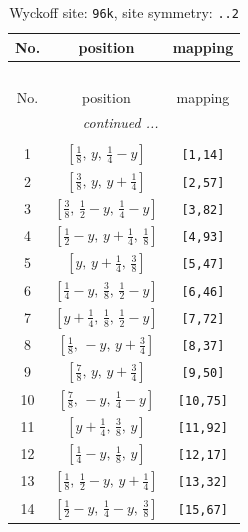 \documentclass[fleqn,8pt]{jsarticle}
\begin{document}
\begin{longtable}{ccc}
\caption{Wyckoff site: {\tt 96k}, site symmetry: {\tt ..2}}
 \\
 \hline \hline
No. & position & mapping \\ \hline \endfirsthead

\multicolumn{2}{l}{\tablename\ \thetable{}} \\
 \hline \hline
No. & position & mapping \\ \hline \endhead

 \hline \hline
\multicolumn{2}{r}{\footnotesize\it continued ...} \\ \endfoot

 \hline \hline
\multicolumn{2}{r}{} \\ \endlastfoot

1 & $\left[ \frac{1}{8},\, y,\, \frac{1}{4} - y \right]$ & {\tt [1,14]} \\ \hline
2 & $\left[ \frac{3}{8},\, y,\, y + \frac{1}{4} \right]$ & {\tt [2,57]} \\ \hline
3 & $\left[ \frac{3}{8},\, \frac{1}{2} - y,\, \frac{1}{4} - y \right]$ & {\tt [3,82]} \\ \hline
4 & $\left[ \frac{1}{2} - y,\, y + \frac{1}{4},\, \frac{1}{8} \right]$ & {\tt [4,93]} \\ \hline
5 & $\left[ y,\, y + \frac{1}{4},\, \frac{3}{8} \right]$ & {\tt [5,47]} \\ \hline
6 & $\left[ \frac{1}{4} - y,\, \frac{3}{8},\, \frac{1}{2} - y \right]$ & {\tt [6,46]} \\ \hline
7 & $\left[ y + \frac{1}{4},\, \frac{1}{8},\, \frac{1}{2} - y \right]$ & {\tt [7,72]} \\ \hline
8 & $\left[ \frac{1}{8},\, - y,\, y + \frac{3}{4} \right]$ & {\tt [8,37]} \\ \hline
9 & $\left[ \frac{7}{8},\, y,\, y + \frac{3}{4} \right]$ & {\tt [9,50]} \\ \hline
10 & $\left[ \frac{7}{8},\, - y,\, \frac{1}{4} - y \right]$ & {\tt [10,75]} \\ \hline
11 & $\left[ y + \frac{1}{4},\, \frac{3}{8},\, y \right]$ & {\tt [11,92]} \\ \hline
12 & $\left[ \frac{1}{4} - y,\, \frac{1}{8},\, y \right]$ & {\tt [12,17]} \\ \hline
13 & $\left[ \frac{1}{8},\, \frac{1}{2} - y,\, y + \frac{1}{4} \right]$ & {\tt [13,32]} \\ \hline
14 & $\left[ \frac{1}{2} - y,\, \frac{1}{4} - y,\, \frac{3}{8} \right]$ & {\tt [15,67]} \\ \hline

\end{longtable}
\end{document}
